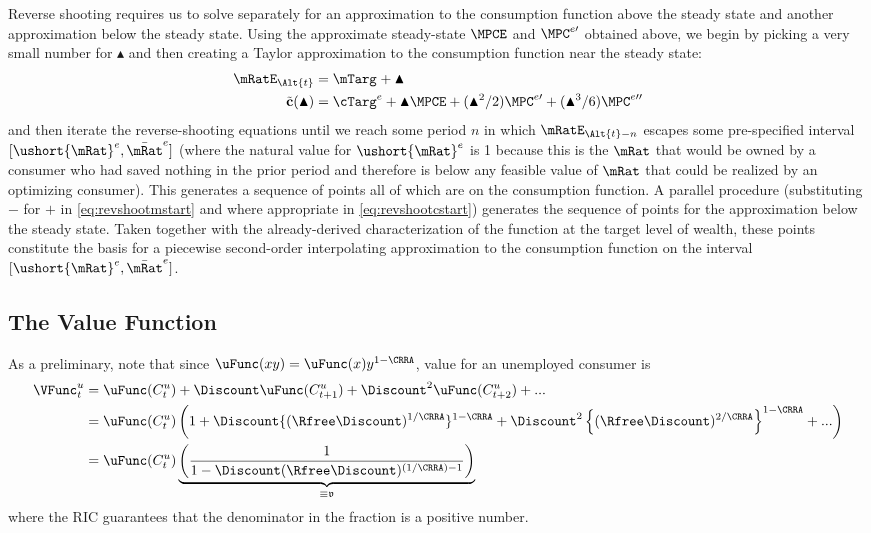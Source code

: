 \documentclass{\handout}
\begin{document}
Reverse shooting requires us to solve separately for an approximation to the consumption function above the steady state and 
another approximation below the steady state.  Using the approximate steady-state $\MPCE$ and $\MPC^{e\prime}$ 
obtained above, we begin by picking a very small number for $\blacktriangle$ and then creating a Taylor
approximation to the consumption function near the steady state:
\begin{align}
  \mRatE_{\Alt{t}} & = \mTarg^{\null} + \blacktriangle  \label{eq:revshootmstart} 
\\ \tilde{\mathbf{c}}(\blacktriangle) & = \cTarg^{e} + \blacktriangle \MPCE+ (\blacktriangle^{2}/2) \MPC^{e\prime}+ (\blacktriangle^{3}/6) \MPC^{e\prime\prime} \label{eq:revshootcstart}
\end{align}
and then iterate the reverse-shooting equations until we reach some period $n$ in
which $\mRatE_{\Alt{t}-n}$ escapes some pre-specified interval $[\ushort{\mRat}^{e},\bar{\mRat}^{e}]$ (where the natural 
value for $\ushort{\mRat}^{e}$ is 1 because this is the $\mRat$ that would be owned by a consumer who had saved
nothing in the prior period and therefore is below any feasible value of $\mRat$ that could be realized by an 
optimizing consumer).  This generates a sequence of points all of which
are on the consumption function.  A parallel procedure (substituting $-$ for
$+$ in \eqref{eq:revshootmstart} and where appropriate in \eqref{eq:revshootcstart}) generates the sequence of points for the approximation below the 
steady state.  Taken together with the already-derived characterization of the function
at the target level of wealth, these points constitute the basis for a piecewise second-order interpolating approximation to the
consumption function on the interval $[\ushort{\mRat}^{e},\bar{\mRat}^{e}]$.

\subsection{The Value Function}

As a preliminary, note that since $\uFunc(xy)=\uFunc(x)y^{1-\CRRA}$, value for an unemployed consumer is 
\begin{equation}\begin{gathered}\begin{aligned}
  \VFunc_{t}^{u} & =  \uFunc(C_{t}^{u})+\Discount \uFunc(C_{t+1}^{u}) + \Discount^{2} \uFunc(C_{t+2}^{u})+...
\\ & =  \uFunc(C_{t}^{u})\left(1+\Discount \{(\Rfree \Discount)^{1/\CRRA}\}^{1-\CRRA} + \Discount^{2}\left\{(\Rfree \Discount)^{2/\CRRA}\right\}^{1-\CRRA}+...\right)
\\ & =  \uFunc(C_{t}^{u})\underbrace{\left(\frac{1}{1-\Discount (\Rfree \Discount)^{(1/\CRRA)-1}}\right)}_{\equiv \mathfrak{v}}
\end{aligned}\end{gathered}\end{equation}
where the RIC guarantees that the denominator in the fraction is a positive number.  
\end{document}
